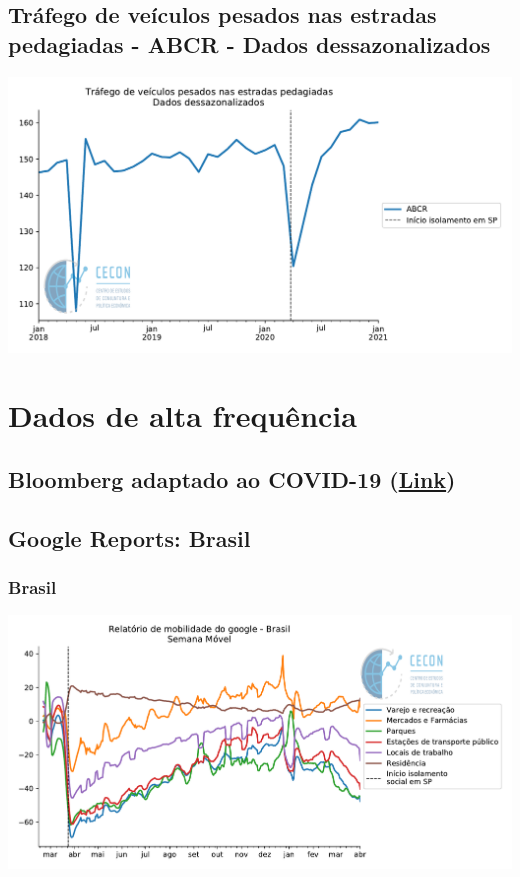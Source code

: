 \documentclass{SelfArx}
\begin{document}
\subsection*{Tráfego de veículos pesados nas estradas pedagiadas - ABCR - Dados dessazonalizados}
\label{sec:org6356d69}


\begin{center}
\includegraphics[width=.9\linewidth]{./figs/Setoriais/TrafegoPedagio.pdf}
\end{center}


\section*{Dados de alta frequência}
\label{sec:orga343f68}

\subsection*{Bloomberg adaptado ao COVID-19 (\href{https://www.bloomberg.com/news/articles/2020-11-13/alternative-data-show-activity-crashes-as-virus-resurges-chart}{Link})}
\label{sec:org9d14cbc}

\subsection*{Google Reports: Brasil}
\label{sec:orgfe161d7}

\subsubsection*{Brasil}
\label{sec:org19da8f8}

\begin{center}
\includegraphics[width=.9\linewidth]{./figs/Granulares/GoogleReport_Brasil.pdf}
\end{center}
\end{document}
